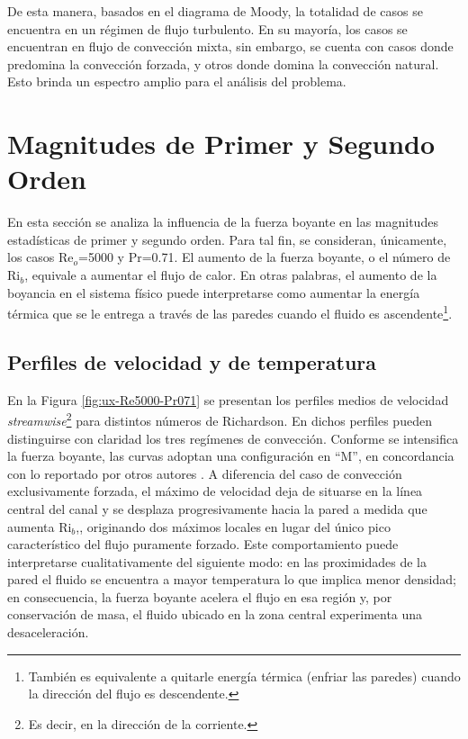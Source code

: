 De esta manera, basados en el diagrama de Moody, la totalidad de casos se encuentra en un régimen de flujo turbulento. En su mayoría, los casos se encuentran en flujo de convección mixta, sin embargo, se cuenta con casos donde predomina la convección forzada, y otros donde domina la convección natural. Esto brinda un espectro amplio para el análisis del problema.

\section{Magnitudes de Primer y Segundo Orden}

En esta sección se analiza la influencia de la fuerza boyante en las magnitudes estadísticas de primer y segundo orden. Para tal fin, se consideran, únicamente, los casos Re$_o$=5000 y Pr=0.71. El aumento de la fuerza boyante, o el número de Ri$_b$, equivale a aumentar el flujo de calor. En otras palabras, el aumento de la boyancia en el sistema físico puede interpretarse como aumentar la energía térmica que se le entrega a través de las paredes cuando el fluido es ascendente\footnote{También es equivalente a quitarle energía térmica (enfriar las paredes) cuando la dirección del flujo es descendente.}.


\subsection{Perfiles de velocidad y de temperatura} \label{sec:velo_temp}

En la Figura \ref{fig:ux-Re5000-Pr071} se presentan los perfiles medios de velocidad  \textit{streamwise}\footnote{Es decir, en la dirección de la corriente.} para distintos números de Richardson. En dichos perfiles pueden distinguirse con claridad los tres regímenes de convección. Conforme se intensifica la fuerza boyante, las curvas adoptan una configuración en ``M'', en concordancia con lo reportado por otros autores \cite{you2003direct, zhou2024direct}. A diferencia del caso de convección exclusivamente forzada, el máximo de velocidad deja de situarse en la línea central del canal y se desplaza progresivamente hacia la pared a medida que aumenta Ri$_b$,\cite{carr1973velocity, steiner1971reverse, zhou2024direct}, originando dos máximos locales en lugar del único pico característico del flujo puramente forzado. Este comportamiento puede interpretarse cualitativamente del siguiente modo: en las proximidades de la pared el fluido se encuentra a mayor temperatura lo que implica menor densidad; en consecuencia, la fuerza boyante acelera el flujo en esa región y, por conservación de masa, el fluido ubicado en la zona central experimenta una desaceleración.

